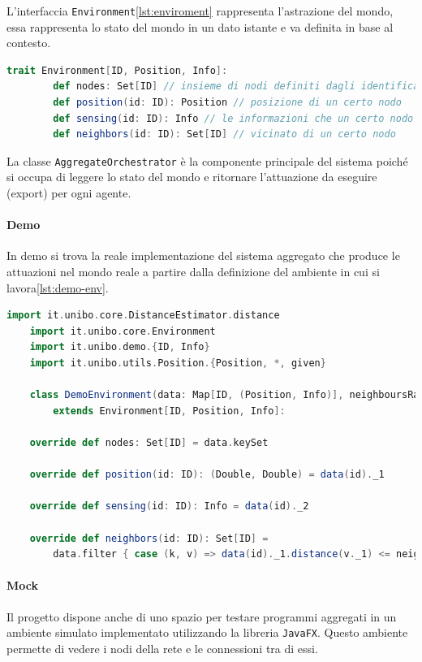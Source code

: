 \documentclass[12pt,a4paper,openright,twoside]{book}
\begin{document}
L'interfaccia \verb|Environment|\cref{lst:enviroment} rappresenta l'astrazione del mondo, essa rappresenta lo stato del mondo in un dato istante e va definita in base al contesto.

\begin{lstlisting}[language=Scala, label={lst:enviroment}, caption={Interfaccia Enviroment}]
    trait Environment[ID, Position, Info]:
        def nodes: Set[ID] // insieme di nodi definiti dagli identificatori ID
        def position(id: ID): Position // posizione di un certo nodo
        def sensing(id: ID): Info // le informazioni che un certo nodo espone
        def neighbors(id: ID): Set[ID] // vicinato di un certo nodo
\end{lstlisting}

La classe \verb|AggregateOrchestrator| è la componente principale del sistema poiché si occupa di leggere lo stato del mondo e ritornare l'attuazione da eseguire (export) per ogni agente.

\paragraph{Demo}
In demo si trova la reale implementazione del sistema aggregato che produce le attuazioni nel mondo reale a partire dalla definizione del ambiente in cui si lavora\cref{lst:demo-env}.

\begin{lstlisting}[language=Scala, label={lst:demo-env}, caption={Definizione dell'ambiente}]
    import it.unibo.core.DistanceEstimator.distance
    import it.unibo.core.Environment
    import it.unibo.demo.{ID, Info}
    import it.unibo.utils.Position.{Position, *, given}

    class DemoEnvironment(data: Map[ID, (Position, Info)], neighboursRadius: Double)
        extends Environment[ID, Position, Info]:

    override def nodes: Set[ID] = data.keySet

    override def position(id: ID): (Double, Double) = data(id)._1

    override def sensing(id: ID): Info = data(id)._2

    override def neighbors(id: ID): Set[ID] =
        data.filter { case (k, v) => data(id)._1.distance(v._1) <= neighboursRadius }.keys.toSet
\end{lstlisting}

\paragraph{Mock}
Il progetto dispone anche di uno spazio per testare programmi aggregati in un ambiente simulato implementato utilizzando la libreria \verb|JavaFX|. Questo ambiente permette di vedere i nodi della rete e le connessioni tra di essi.
\end{document}
